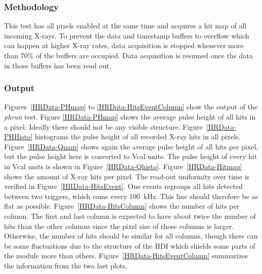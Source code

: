 \documentclass[a4paper,12pt,twoside]{article}
\begin{document}
\subsubsection{Methodology}
This test has all pixels enabled at the same time and acquires a hit map of all incoming X-rays. To prevent the data and timestamp buffers to overflow which can happen at higher X-ray rates, data acquisition is stopped whenever more than 70\% of the buffers are occupied. Data acquisition is resumed once the data in those buffers has been read out.
\subsubsection{Output}

Figures~\ref{HRData-PHmap} to \ref{HRData-HitsEventColumn} show the output of the \textit{phrun} test. Figure \ref{HRData-PHmap} shows the average pulse height of all hits in a pixel. Ideally there should not be any visible structure. Figure~\ref{HRData-PHHisto} histograms the pulse height of all recorded X-ray hits in all pixels. Figure~\ref{HRData-Qmap} shows again the average pulse height of all hits per pixel, but the pulse height here is converted to Vcal units. The pulse height of every hit in Vcal units is shown in Figure~\ref{HRData-Qhisto}. Figure~\ref{HRData-Hitmap} shows the amount of X-ray hits per pixel. The read-out uniformity over time is verified in Figure~\ref{HRData-HitsEvent}. One events regroups all hits detected between two triggers, which come every \SI{100}{\kilo\hertz}. This line should therefore be as flat as possible. Figure~\ref{HRData-HitsColumn} shows the number of hits per column. The first and last column is expected to have about twice the number of hits than the other columns since the pixel size of those columns is larger. Otherwise, the number of hits should be similar for all columns, though there can be some fluctuations due to the structure of the HDI which shields some parts of the module more than others. Figure~\ref{HRData-HitsEventColumn} summarizes the information from the two last plots.
\end{document}
